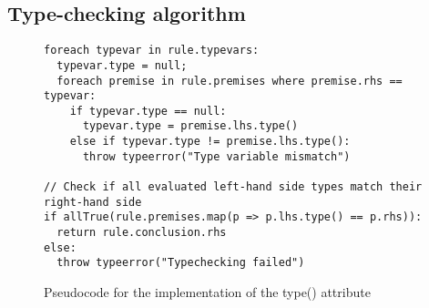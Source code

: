 \documentclass[nofilelist]{cslthse-msc}
\begin{document}
\subsection{Type-checking algorithm}\label{typecheckingalgorithm}


\begin{figure}[]
\begin{lstlisting}[]
foreach typevar in rule.typevars:
  typevar.type = null;
  foreach premise in rule.premises where premise.rhs == typevar:
    if typevar.type == null:
      typevar.type = premise.lhs.type()
    else if typevar.type != premise.lhs.type():
      throw typeerror("Type variable mismatch")

// Check if all evaluated left-hand side types match their right-hand side
if allTrue(rule.premises.map(p => p.lhs.type() == p.rhs)):
  return rule.conclusion.rhs
else:
  throw typeerror("Typechecking failed")
\end{lstlisting}
  \caption{Pseudocode for the implementation of the type() attribute}
  \label{psuedotype}
\end{figure}
\end{document}
